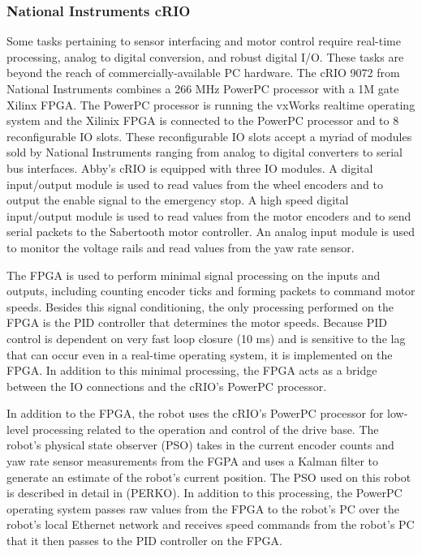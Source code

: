 \documentclass{article}
\begin{document}
\subsubsection[National Instruments cRIO]{National Instruments cRIO}
Some tasks pertaining to sensor interfacing and motor control require real-time processing, analog to digital conversion, and robust digital I/O. These tasks are beyond the reach of commercially-available PC hardware. The cRIO 9072 from National Instruments combines a 266 MHz PowerPC processor with a 1M gate Xilinx FPGA. The PowerPC processor is running the vxWorks realtime operating system and the Xilinix FPGA is connected to the PowerPC processor and to 8 reconfigurable IO slots. These reconfigurable IO slots accept a myriad of modules sold by National Instruments ranging from analog to digital converters to serial bus interfaces. Abby{\textquoteright}s cRIO is equipped with three IO modules. A digital input/output module is used to read values from the wheel encoders and to output the enable signal to the emergency stop. A high speed digital input/output module is used to read values from the motor encoders and to send serial packets to the Sabertooth motor controller. An analog input module is used to monitor the voltage rails and read values from the yaw rate sensor.

The FPGA is used to perform minimal signal processing on the inputs and outputs, including counting encoder ticks and forming packets to command motor speeds. Besides this signal conditioning, the only processing performed on the FPGA is the PID controller that determines the motor speeds. Because PID control is dependent on very fast loop closure (10 ms) and is sensitive to the lag that can occur even in a real-time operating system, it is implemented on the FPGA. In addition to this minimal processing, the FPGA acts as a bridge between the IO connections and the cRIO{\textquoteright}s PowerPC processor.

In addition to the FPGA, the robot uses the cRIO{\textquoteright}s PowerPC processor for low-level processing related to the operation and control of the drive base. The robot{\textquoteright}s physical state observer (PSO) takes in the current encoder counts and yaw rate sensor measurements from the FGPA and uses a Kalman filter to generate an estimate of the robot{\textquoteright}s current position. The PSO used on this robot is described in detail in (PERKO). In addition to this processing, the PowerPC operating system passes raw values from the FPGA to the robot{\textquoteright}s PC over the robot{\textquoteright}s local Ethernet network and receives speed commands from the robot{\textquoteright}s PC that it then passes to the PID controller on the FPGA.
\end{document}
